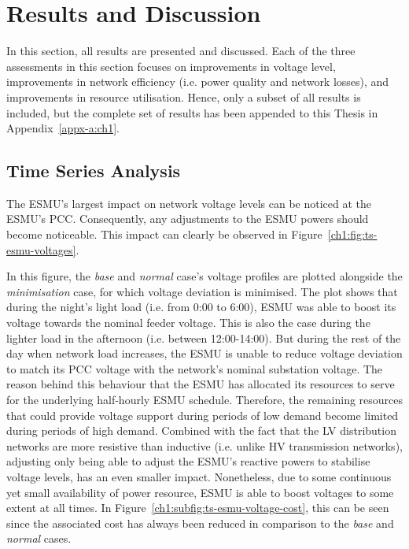 \section{Results and Discussion}
\label{ch1:sec:results-and-discussion}

In this section, all results are presented and discussed.
Each of the three assessments in this section focuses on improvements in voltage level, improvements in network efficiency (i.e. power quality and network losses), and improvements in resource utilisation.
Hence, only a subset of all results is included, but the complete set of results has been appended to this Thesis in Appendix~\ref{appx-a:ch1}.

\subsection{Time Series Analysis}
\label{ch1:subsec:time-series-analysis}

The ESMU's largest impact on network voltage levels can be noticed at the ESMU's PCC.
Consequently, any adjustments to the ESMU powers should become noticeable.
This impact can clearly be observed in Figure~\ref{ch1:fig:ts-esmu-voltages}.



In this figure, the \textit{base} and \textit{normal} case's voltage profiles are plotted alongside the \textit{minimisation} case, for which voltage deviation is minimised.
The plot shows that during the night's light load (i.e. from 0:00 to 6:00), ESMU was able to boost its voltage towards the nominal feeder voltage.
This is also the case during the lighter load in the afternoon (i.e. between 12:00-14:00).
But during the rest of the day when network load increases, the ESMU is unable to reduce voltage deviation to match its PCC voltage with the network's nominal substation voltage.
The reason behind this behaviour that the ESMU has allocated its resources to serve for the underlying half-hourly ESMU schedule.
Therefore, the remaining resources that could provide voltage support during periods of low demand become limited during periods of high demand.
Combined with the fact that the LV distribution networks are more resistive than inductive (i.e. unlike HV transmission networks), adjusting only being able to adjust the ESMU's reactive powers to stabilise voltage levels, has an even smaller impact.
Nonetheless, due to some continuous yet small availability of power resource, ESMU is able to boost voltages to some extent at all times. In Figure~\ref{ch1:subfig:ts-esmu-voltage-cost}, this can be seen since the associated cost has always been reduced in comparison to the \textit{base} and \textit{normal} cases.

